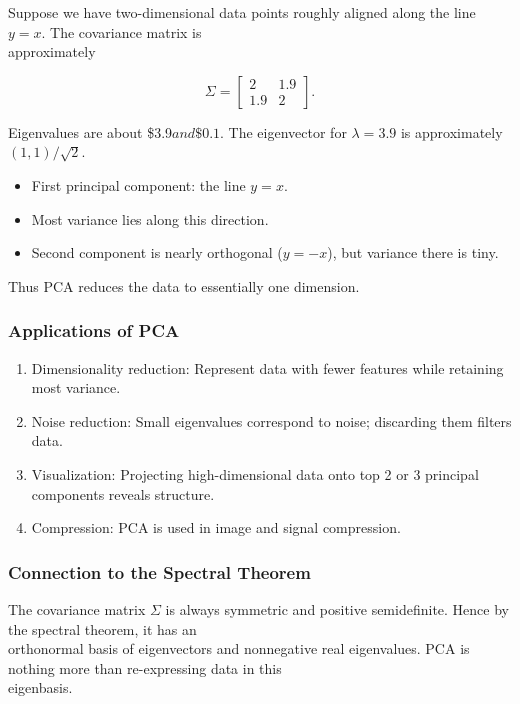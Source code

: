\documentclass[
  12pt,
  a4paper,
]{article}
\begin{document}
Suppose we have two-dimensional data points roughly aligned along the
line \(y = x\). The covariance matrix is\\
approximately

\[\Sigma =
\begin{bmatrix}
2 & 1.9 \\
1.9 & 2
\end{bmatrix}.\]

Eigenvalues are about \$3.9\( and \$0.1\). The eigenvector for
\(\lambda = 3.9\) is approximately \((1,1)/\sqrt{2}\).

\begin{itemize}
\item
  First principal component: the line \(y = x\).
\item
  Most variance lies along this direction.
\item
  Second component is nearly orthogonal (\(y = -x\)), but variance there
  is tiny.
\end{itemize}

Thus PCA reduces the data to essentially one dimension.

\subsubsection{Applications of PCA}\label{applications-of-pca}

\begin{enumerate}
\def\labelenumi{\arabic{enumi}.}
\item
  Dimensionality reduction: Represent data with fewer features while
  retaining most variance.
\item
  Noise reduction: Small eigenvalues correspond to noise; discarding
  them filters data.
\item
  Visualization: Projecting high-dimensional data onto top 2 or 3
  principal components reveals structure.
\item
  Compression: PCA is used in image and signal compression.
\end{enumerate}

\subsubsection{Connection to the Spectral
Theorem}\label{connection-to-the-spectral-theorem}

The covariance matrix \(\Sigma\) is always symmetric and positive
semidefinite. Hence by the spectral theorem, it has an\\
orthonormal basis of eigenvectors and nonnegative real eigenvalues. PCA
is nothing more than re-expressing data in this\\
eigenbasis.
\end{document}
